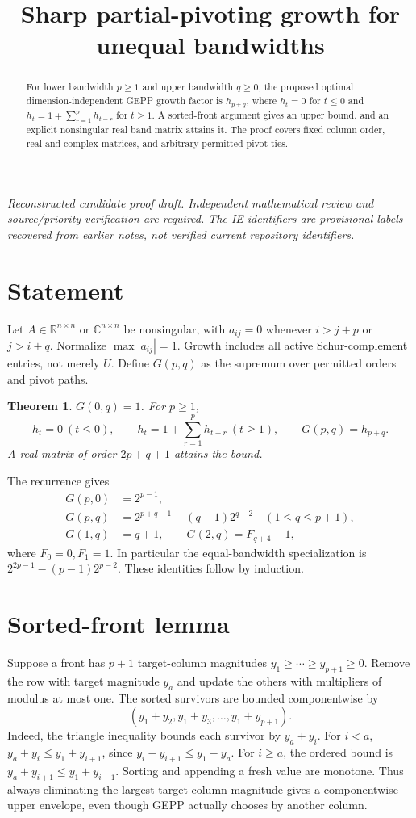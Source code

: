 \documentclass[11pt]{article}
\title{Sharp partial-pivoting growth for unequal bandwidths}
\author{}
\date{}
\newtheorem{theorem}{Theorem}
\newcommand{\R}{\mathbb R}
\newcommand{\C}{\mathbb C}
\begin{document}
\maketitle
\noindent\textit{Reconstructed candidate proof draft. Independent mathematical review and source/priority verification are required. The IE identifiers are provisional labels recovered from earlier notes, not verified current repository identifiers.}


\begin{abstract}
For lower bandwidth $p\ge1$ and upper bandwidth $q\ge0$, the proposed optimal dimension-independent GEPP growth factor is $h_{p+q}$, where $h_t=0$ for $t\le0$ and $h_t=1+\sum_{r=1}^p h_{t-r}$ for $t\ge1$. A sorted-front argument gives an upper bound, and an explicit nonsingular real band matrix attains it. The proof covers fixed column order, real and complex matrices, and arbitrary permitted pivot ties.
\end{abstract}
\section{Statement}
Let $A\in\R^{n\times n}$ or $\C^{n\times n}$ be nonsingular, with $a_{ij}=0$ whenever $i>j+p$ or $j>i+q$. Normalize $\max|a_{ij}|=1$. Growth includes all active Schur-complement entries, not merely $U$. Define $G(p,q)$ as the supremum over permitted orders and pivot paths.
\begin{theorem}
$G(0,q)=1$. For $p\ge1$,
\[
 h_t=0\ (t\le0),\qquad h_t=1+\sum_{r=1}^p h_{t-r}\ (t\ge1),\qquad
 \boxed{G(p,q)=h_{p+q}.}
\]
A real matrix of order $2p+q+1$ attains the bound.
\end{theorem}
The recurrence gives
\begin{align*}
G(p,0)&=2^{p-1},\\
G(p,q)&=2^{p+q-1}-(q-1)2^{q-2}\quad(1\le q\le p+1),\\
G(1,q)&=q+1,\qquad G(2,q)=F_{q+4}-1,
\end{align*}
where $F_0=0,F_1=1$. In particular the equal-bandwidth specialization is $2^{2p-1}-(p-1)2^{p-2}$. These identities follow by induction.
\section{Sorted-front lemma}
Suppose a front has $p+1$ target-column magnitudes $y_1\ge\cdots\ge y_{p+1}\ge0$. Remove the row with target magnitude $y_a$ and update the others with multipliers of modulus at most one. The sorted survivors are bounded componentwise by
\[
(y_1+y_2,y_1+y_3,\ldots,y_1+y_{p+1}).
\]
Indeed, the triangle inequality bounds each survivor by $y_a+y_i$. For $i<a$, $y_a+y_i\le y_1+y_{i+1}$, since $y_i-y_{i+1}\le y_1-y_a$. For $i\ge a$, the ordered bound is $y_a+y_{i+1}\le y_1+y_{i+1}$. Sorting and appending a fresh value are monotone. Thus always eliminating the largest target-column magnitude gives a componentwise upper envelope, even though GEPP actually chooses by another column.
\end{document}
